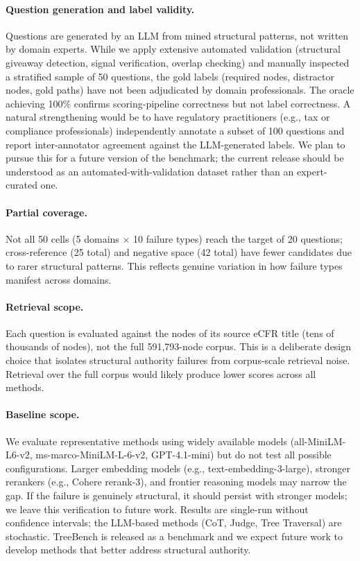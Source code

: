 \documentclass[11pt]{article}
\begin{document}
\paragraph{Question generation and label validity.} Questions are generated by an LLM from mined structural patterns, not written by domain experts. While we apply extensive automated validation (structural giveaway detection, signal verification, overlap checking) and manually inspected a stratified sample of 50 questions, the gold labels (required nodes, distractor nodes, gold paths) have not been adjudicated by domain professionals. The oracle achieving 100\% confirms scoring-pipeline correctness but not label correctness. A natural strengthening would be to have regulatory practitioners (e.g., tax or compliance professionals) independently annotate a subset of 100 questions and report inter-annotator agreement against the LLM-generated labels. We plan to pursue this for a future version of the benchmark; the current release should be understood as an automated-with-validation dataset rather than an expert-curated one.

\paragraph{Partial coverage.} Not all 50 cells (5 domains $\times$ 10 failure types) reach the target of 20 questions; cross-reference (25 total) and negative space (42 total) have fewer candidates due to rarer structural patterns. This reflects genuine variation in how failure types manifest across domains.

\paragraph{Retrieval scope.} Each question is evaluated against the nodes of its source eCFR title (tens of thousands of nodes), not the full 591,793-node corpus. This is a deliberate design choice that isolates structural authority failures from corpus-scale retrieval noise. Retrieval over the full corpus would likely produce lower scores across all methods.

\paragraph{Baseline scope.} We evaluate representative methods using widely available models (all-MiniLM-L6-v2, ms-marco-MiniLM-L-6-v2, GPT-4.1-mini) but do not test all possible configurations. Larger embedding models (e.g., text-embedding-3-large), stronger rerankers (e.g., Cohere rerank-3), and frontier reasoning models may narrow the gap. If the failure is genuinely structural, it should persist with stronger models; we leave this verification to future work. Results are single-run without confidence intervals; the LLM-based methods (CoT, Judge, Tree Traversal) are stochastic. TreeBench is released as a benchmark and we expect future work to develop methods that better address structural authority.
\end{document}
